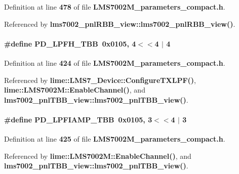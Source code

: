 Definition at line {\bf 478} of file {\bf L\+M\+S7002\+M\+\_\+parameters\+\_\+compact.\+h}.



Referenced by {\bf lms7002\+\_\+pnl\+R\+B\+B\+\_\+view\+::lms7002\+\_\+pnl\+R\+B\+B\+\_\+view()}.

\paragraph[{P\+D\+\_\+\+L\+P\+F\+H\+\_\+\+T\+BB}]{\setlength{\rightskip}{0pt plus 5cm}\#define P\+D\+\_\+\+L\+P\+F\+H\+\_\+\+T\+BB~0x0105, 4$<$$<$4 $\vert$  4}\label{LMS7002M__parameters__compact_8h_a9115504a13a6c38e941218472db4ca24}


Definition at line {\bf 424} of file {\bf L\+M\+S7002\+M\+\_\+parameters\+\_\+compact.\+h}.



Referenced by {\bf lime\+::\+L\+M\+S7\+\_\+\+Device\+::\+Configure\+T\+X\+L\+P\+F()}, {\bf lime\+::\+L\+M\+S7002\+M\+::\+Enable\+Channel()}, and {\bf lms7002\+\_\+pnl\+T\+B\+B\+\_\+view\+::lms7002\+\_\+pnl\+T\+B\+B\+\_\+view()}.

\paragraph[{P\+D\+\_\+\+L\+P\+F\+I\+A\+M\+P\+\_\+\+T\+BB}]{\setlength{\rightskip}{0pt plus 5cm}\#define P\+D\+\_\+\+L\+P\+F\+I\+A\+M\+P\+\_\+\+T\+BB~0x0105, 3$<$$<$4 $\vert$  3}\label{LMS7002M__parameters__compact_8h_a4b4b055f3732eb29908def3f0b321239}


Definition at line {\bf 425} of file {\bf L\+M\+S7002\+M\+\_\+parameters\+\_\+compact.\+h}.



Referenced by {\bf lime\+::\+L\+M\+S7002\+M\+::\+Enable\+Channel()}, and {\bf lms7002\+\_\+pnl\+T\+B\+B\+\_\+view\+::lms7002\+\_\+pnl\+T\+B\+B\+\_\+view()}.

